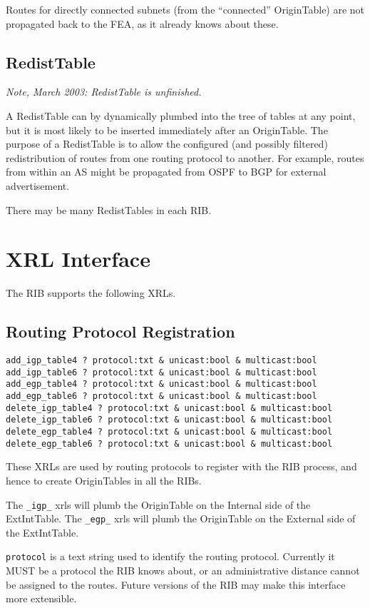 \documentclass[11pt]{article}
\begin{document}
Routes for directly connected subnets (from the ``connected''
OriginTable) are not propagated back to the FEA, as it already knows
about these.

\subsection{RedistTable}

{\it Note, March 2003: RedistTable is unfinished.}

A RedistTable can by dynamically plumbed into the tree of tables at
any point, but it is most likely to be inserted immediately after an
OriginTable.  The purpose of a RedistTable is to allow the configured
(and possibly filtered) redistribution of routes from one routing
protocol to another.  For example, routes from within an AS might be
propagated from OSPF to BGP for external advertisement.

There may be many RedistTables in each RIB.

\section{XRL Interface}

The RIB supports the following XRLs.
\subsection{Routing Protocol Registration}
\begin{verbatim}
add_igp_table4 ? protocol:txt & unicast:bool & multicast:bool
add_igp_table6 ? protocol:txt & unicast:bool & multicast:bool
add_egp_table4 ? protocol:txt & unicast:bool & multicast:bool
add_egp_table6 ? protocol:txt & unicast:bool & multicast:bool
delete_igp_table4 ? protocol:txt & unicast:bool & multicast:bool
delete_igp_table6 ? protocol:txt & unicast:bool & multicast:bool
delete_egp_table4 ? protocol:txt & unicast:bool & multicast:bool
delete_egp_table6 ? protocol:txt & unicast:bool & multicast:bool
\end{verbatim}
These XRLs are used by routing protocols to register with the RIB
process, and hence to create OriginTables in all the RIBs.

The {\tt \_igp\_} xrls will plumb the OriginTable on the Internal side
of the ExtIntTable.  The {\tt \_egp\_} xrls will plumb the OriginTable
on the External side of the ExtIntTable.

{\tt protocol} is a text string used to identify the routing protocol.
Currently it MUST be a protocol the RIB knows about, or an
administrative distance cannot be assigned to the routes.  Future
versions of the RIB may make this interface more extensible.
\end{document}
